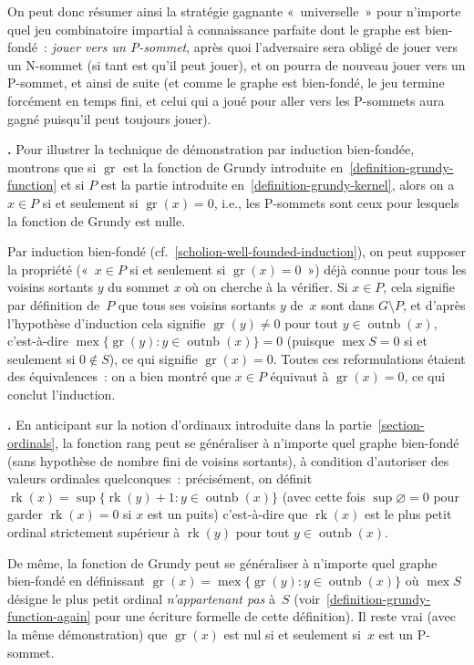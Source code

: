\documentclass[12pt,a4paper]{article}
\theoremstyle{definition}
\newcommand\thingy{%
\refstepcounter{comcnt}\smallskip\noindent\textbf{\thecomcnt.} }
\newcommand{\outnb}{\operatorname{outnb}}
\newcommand{\mex}{\operatorname{mex}}
\newcommand{\gr}{\operatorname{gr}}
\newcommand{\rk}{\operatorname{rk}}
\begin{document}
On peut donc résumer ainsi la stratégie gagnante « universelle » pour
n'importe quel jeu combinatoire impartial à connaissance parfaite dont
le graphe est bien-fondé : \emph{jouer vers un P-sommet}, après quoi
l'adversaire sera obligé de jouer vers un N-sommet (si tant est qu'il
peut jouer), et on pourra de nouveau jouer vers un P-sommet, et ainsi
de suite (et comme le graphe est bien-fondé, le jeu termine forcément
en temps fini, et celui qui a joué pour aller vers les P-sommets aura
gagné puisqu'il peut toujours jouer).

\thingy Pour illustrer la technique de démonstration par induction
bien-fondée, montrons que si $\gr$ est la fonction de Grundy
introduite en \ref{definition-grundy-function} et si $P$ est la partie
introduite en \ref{definition-grundy-kernel}, alors on a $x \in P$ si
et seulement si $\gr(x) = 0$, i.e., les P-sommets sont ceux pour
lesquels la fonction de Grundy est nulle.

Par induction bien-fondé (cf. \ref{scholion-well-founded-induction}),
on peut supposer la propriété (« $x \in P$ si et seulement si
  $\gr(x) = 0$ ») déjà connue pour tous les voisins sortants $y$ du
sommet $x$ où on cherche à la vérifier.  Si $x \in P$, cela signifie
par définition de $P$ que tous ses voisins sortants $y$ de $x$ sont
dans $G \setminus P$, et d'après l'hypothèse d'induction cela signifie
$\gr(y) \neq 0$ pour tout $y \in \outnb(x)$, c'est-à-dire
$\mex\{\gr(y) : y\in\outnb(x)\} = 0$ (puisque $\mex S = 0$ si et
seulement si $0 \not\in S$), ce qui signifie $\gr(x) = 0$.  Toutes
ces reformulations étaient des équivalences : on a bien montré que $x
\in P$ équivaut à $\gr(x) = 0$, ce qui conclut l'induction.

\thingy\label{ordinal-valued-rank-and-grundy-function} En anticipant
sur la notion d'ordinaux introduite dans la
partie \ref{section-ordinals}, la fonction rang peut se généraliser à
n'importe quel graphe bien-fondé (sans hypothèse de nombre fini de
voisins sortants), à condition d'autoriser des valeurs ordinales
quelconques : précisément, on définit $\rk(x) = \sup\{\rk(y)+1 :
y\in\outnb(x)\}$ (avec cette fois $\sup\varnothing = 0$ pour garder
$\rk(x) = 0$ si $x$ est un puits) c'est-à-dire que $\rk(x)$ est le
plus petit ordinal strictement supérieur à $\rk(y)$ pour tout
$y\in\outnb(x)$.

De même, la fonction de Grundy peut se généraliser à n'importe quel
graphe bien-fondé en définissant $\gr(x) = \mex\{\gr(y) :
y\in\outnb(x)\}$ où $\mex S$ désigne le plus petit ordinal
\emph{n'appartenant pas} à $S$
(voir \ref{definition-grundy-function-again} pour une écriture
formelle de cette définition).  Il reste vrai (avec la même
démonstration) que $\gr(x)$ est nul si et seulement si $x$ est un
P-sommet.
\end{document}
